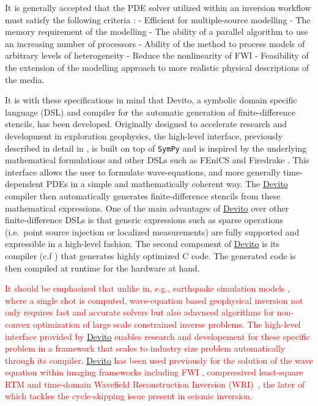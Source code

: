 \documentclass[10pt, conference]{IEEEtran}
\newcommand{\devito}{\href{https://github.com/devitocodes/devito}{Devito} }
\begin{document}
It is generally accepted that the PDE solver utilized within an
inversion workflow must satisfy the following criteria
\cite{virieuxmodelling}: - Efficient for multiple-source modelling - The
memory requirement of the modelling - The ability of a parallel algorithm
to use an increasing number of processors - Ability of the method to
process models of arbitrary levels of heterogeneity - Reduce the
nonlinearity of FWI - Feasibility of the extension of the modelling
approach to more realistic physical descriptions of the media.

It is with these specifications in mind that Devito, a symbolic domain
specific language (DSL) and compiler for the automatic generation of
finite-difference stencils, has been developed. Originally designed to
accelerate research and development in exploration geophysics, the
high-level interface, previously described in detail in \cite{devito-api},
is built on top of \texttt{SymPy} \cite{sympy} and is inspired by the
underlying mathematical formulations and other DSLs such as FEniCS
\cite{fenics} and Firedrake \cite{firedrake}. This interface allows the
user to formulate wave-equations, and more generally time-dependent PDEs
in a simple and mathematically coherent way. The \devito compiler then
automatically generates finite-difference stencils from these mathematical
expressions. One of the main advantages of \devito over other
finite-difference DSLs is that generic expressions such as sparse
operations (i.e.~point source injection or localized measurements) are
fully supported and expressible in a high-level fashion. The second
component of \devito is its compiler (c.f \cite{devito-compiler}) that
generates highly optimized C code. The generated code is then compiled at
runtime for the hardware at hand.

\textcolor{red}{It should be emphasized that unlike in,
e.g., earthquake simulation models \cite{fu201718}, where
a single shot is computed, wave-equation based
geophysical inversion not only requires
fast and accurate solvers but also adavnced algorithms for
non-convex optimization of large scale constrained inverse problems. The 
high-level interface provided by \devito enables research and developement for these 
specific problem in a framework that scales to industry size problem 
automatically through its compiler. \devito has been used previously
for the solution of the wave equation within imaging frameworks including
FWI \cite{witte2018alf}, compressived least-square RTM \cite{witte2018cls} and
time-domain Wavefield Reconstruction Inversion (WRI)~\cite{rizzuti2020EAGEtwri, 
louboutin2020SEGtwri}, the later of which tackles the cycle-skipping issue
present in seismic inversion.}
\end{document}
